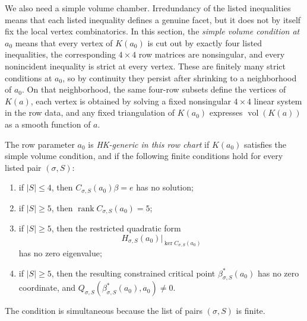 \begin{unverified}
We also need a simple volume chamber. Irredundancy of the listed inequalities
means that each listed inequality defines a genuine facet, but it does not by
itself fix the local vertex combinatorics. In this section, the \emph{simple
volume condition at \(a_0\)} means that every vertex of \(K(a_0)\) is cut out
by exactly four listed inequalities, the corresponding \(4\times4\) row
matrices are nonsingular, and every nonincident inequality is strict at every
vertex. These are finitely many strict conditions at \(a_0\), so by continuity
they persist after shrinking to a neighborhood of \(a_0\). On that
neighborhood, the same four-row subsets define the vertices of \(K(a)\), each
vertex is obtained by solving a fixed nonsingular \(4\times4\) linear system
in the row data, and any fixed triangulation of \(K(a_0)\) expresses
\(\operatorname{vol}(K(a))\) as a smooth function of \(a\).

\begin{definition}
\label{def:hk-generic-row-parameter}
The row parameter \(a_0\) is \emph{HK-generic in this row chart} if
\(K(a_0)\) satisfies the simple volume condition, and if the following finite
conditions hold for every listed pair \((\sigma,S)\):
\begin{enumerate}
\item if \(|S|\leq4\), then \(C_{\sigma,S}(a_0)\beta=e\) has no solution;
\item if \(|S|\geq5\), then \(\operatorname{rank} C_{\sigma,S}(a_0)=5\);
\item if \(|S|\geq5\), then the restricted quadratic form
  \[
    H_{\sigma,S}(a_0)|_{\ker C_{\sigma,S}(a_0)}
  \]
  has no zero eigenvalue;
\item if \(|S|\geq5\), then the resulting constrained critical point
  \(\beta^*_{\sigma,S}(a_0)\) has no zero coordinate, and
  \(Q_{\sigma,S}(\beta^*_{\sigma,S}(a_0),a_0)\neq0\).
\end{enumerate}
The condition is simultaneous because the list of pairs \((\sigma,S)\) is
finite.
\end{definition}


\end{unverified}

